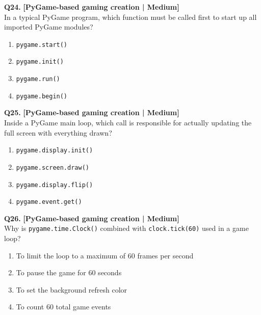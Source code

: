 \noindent\textbf{Q24.} \hfill {\small\color{LPUOrange}\textbf{[PyGame-based gaming creation | Medium]}}\\[2pt]
In a typical PyGame program, which function must be called first to start up all imported PyGame modules?

\begin{enumerate}[label=(\alph*),topsep=2pt,itemsep=1pt,partopsep=0pt,parsep=0pt]
    \item \relax \texttt{pygame.start()}
    \item \relax \texttt{pygame.init()}
    \item \relax \texttt{pygame.run()}
    \item \relax \texttt{pygame.begin()}
\end{enumerate}
\vspace{2mm}

\noindent\textbf{Q25.} \hfill {\small\color{LPUOrange}\textbf{[PyGame-based gaming creation | Medium]}}\\[2pt]
Inside a PyGame main loop, which call is responsible for actually updating the full screen with everything drawn?

\begin{enumerate}[label=(\alph*),topsep=2pt,itemsep=1pt,partopsep=0pt,parsep=0pt]
    \item \relax \texttt{pygame.display.init()}
    \item \relax \texttt{pygame.screen.draw()}
    \item \relax \texttt{pygame.display.flip()}
    \item \relax \texttt{pygame.event.get()}
\end{enumerate}
\vspace{2mm}

\noindent\textbf{Q26.} \hfill {\small\color{LPUOrange}\textbf{[PyGame-based gaming creation | Medium]}}\\[2pt]
Why is \texttt{pygame.time.Clock()} combined with \texttt{clock.tick(60)} used in a game loop?

\begin{enumerate}[label=(\alph*),topsep=2pt,itemsep=1pt,partopsep=0pt,parsep=0pt]
    \item \relax To limit the loop to a maximum of 60 frames per second
    \item \relax To pause the game for 60 seconds
    \item \relax To set the background refresh color
    \item \relax To count 60 total game events
\end{enumerate}
\vspace{2mm}

